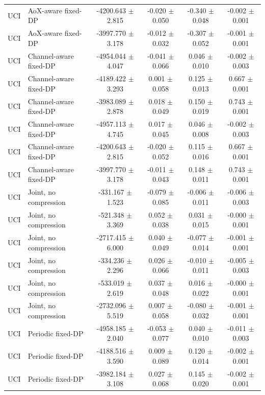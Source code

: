 \begin{tabular}{llcccc}
UCI & AoX-aware fixed-DP & -4200.643 $\pm$ 2.815 & -0.020 $\pm$ 0.050 & -0.340 $\pm$ 0.048 & -0.002 $\pm$ 0.001 \\
UCI & AoX-aware fixed-DP & -3997.770 $\pm$ 3.178 & -0.012 $\pm$ 0.032 & -0.307 $\pm$ 0.052 & -0.001 $\pm$ 0.001 \\
UCI & Channel-aware fixed-DP & -4954.044 $\pm$ 4.047 & -0.041 $\pm$ 0.066 & 0.046 $\pm$ 0.010 & -0.002 $\pm$ 0.003 \\
UCI & Channel-aware fixed-DP & -4189.422 $\pm$ 3.293 & 0.001 $\pm$ 0.058 & 0.125 $\pm$ 0.013 & 0.667 $\pm$ 0.001 \\
UCI & Channel-aware fixed-DP & -3983.089 $\pm$ 2.878 & 0.018 $\pm$ 0.049 & 0.150 $\pm$ 0.019 & 0.743 $\pm$ 0.001 \\
UCI & Channel-aware fixed-DP & -4957.113 $\pm$ 4.745 & 0.017 $\pm$ 0.045 & 0.046 $\pm$ 0.008 & -0.002 $\pm$ 0.003 \\
UCI & Channel-aware fixed-DP & -4200.643 $\pm$ 2.815 & -0.020 $\pm$ 0.052 & 0.115 $\pm$ 0.016 & 0.667 $\pm$ 0.001 \\
UCI & Channel-aware fixed-DP & -3997.770 $\pm$ 3.178 & -0.011 $\pm$ 0.043 & 0.148 $\pm$ 0.011 & 0.743 $\pm$ 0.001 \\
UCI & Joint, no compression & -331.167 $\pm$ 1.523 & -0.079 $\pm$ 0.085 & -0.006 $\pm$ 0.011 & -0.006 $\pm$ 0.003 \\
UCI & Joint, no compression & -521.348 $\pm$ 3.369 & 0.052 $\pm$ 0.038 & 0.031 $\pm$ 0.015 & -0.000 $\pm$ 0.001 \\
UCI & Joint, no compression & -2717.415 $\pm$ 6.000 & 0.040 $\pm$ 0.049 & -0.077 $\pm$ 0.014 & -0.001 $\pm$ 0.001 \\
UCI & Joint, no compression & -334.236 $\pm$ 2.296 & 0.026 $\pm$ 0.066 & -0.010 $\pm$ 0.011 & -0.005 $\pm$ 0.003 \\
UCI & Joint, no compression & -533.019 $\pm$ 2.619 & 0.037 $\pm$ 0.048 & 0.016 $\pm$ 0.022 & -0.000 $\pm$ 0.001 \\
UCI & Joint, no compression & -2732.096 $\pm$ 5.519 & 0.007 $\pm$ 0.058 & -0.080 $\pm$ 0.032 & -0.001 $\pm$ 0.001 \\
UCI & Periodic fixed-DP & -4958.185 $\pm$ 2.040 & -0.053 $\pm$ 0.077 & 0.040 $\pm$ 0.010 & -0.011 $\pm$ 0.003 \\
UCI & Periodic fixed-DP & -4188.516 $\pm$ 3.590 & 0.009 $\pm$ 0.089 & 0.120 $\pm$ 0.014 & -0.002 $\pm$ 0.001 \\
UCI & Periodic fixed-DP & -3982.184 $\pm$ 3.108 & 0.027 $\pm$ 0.068 & 0.145 $\pm$ 0.020 & -0.002 $\pm$ 0.001 \\

\end{tabular}
